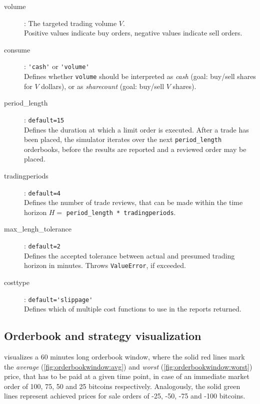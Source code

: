 \begin{description}
\item[volume] : The targeted trading volume $V$.\\
Positive values indicate buy orders, negative values indicate sell orders.
\item[consume] : \lstinline!'cash'! or \lstinline!'volume'!\\
Defines whether \lstinline!volume! should be interpreted as \emph{cash} (goal: buy/sell shares for $V$ dollars), or as \emph{sharecount} (goal: buy/sell $V$ shares).
\item[period\_length] : \lstinline!default=15!\\
Defines the duration at which a limit order is executed. After a trade has been placed, the simulator iterates over the next \lstinline!period_length! orderbooks, before the results are reported and a reviewed order may be placed.

\item[tradingperiods] : \lstinline!default=4!\\
Defines the number of trade reviews, that can be made within the time horizon $H =$ \lstinline!period_length * tradingperiods!.

\item[max\_lengh\_tolerance] : \lstinline!default=2!\\
Defines the accepted tolerance between actual and presumed trading horizon in minutes. Throws \lstinline!ValueError!, if exceeded.

\item[costtype] : \lstinline!default='slippage'!\\
Defines which of multiple cost functions to use in the reports returned. 
\end{description}

\subsection{Orderbook and strategy visualization}

 visualizes a 60 minutes long orderbook window, where the solid red lines mark the \emph{average} (\ref{fig:orderbookwindow:avg}) and \emph{worst} (\ref{fig:orderbookwindow:worst}) price, that has to be paid at a given time point, in case of an immediate market order of 100, 75, 50 and 25 bitcoins respectively. Analogously, the solid green lines represent achieved prices for sale orders of -25, -50, -75 and -100 bitcoins.\\

